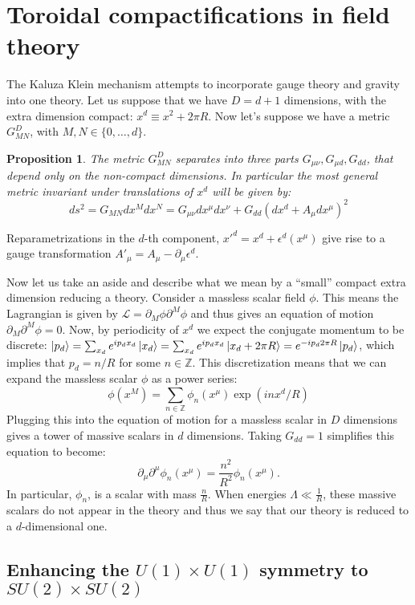 \documentclass{report}
\theoremstyle{plain}
\newtheorem{proposition}[theorem]{Proposition}
\theoremstyle{definition}
\theoremstyle{remark}
\newcommand{\FR}[2]{\frac{#1}{#2}}
\newcommand{\mc}{\mathcal}
\newcommand{\di}{\partial}
\newcommand{\bZ}{\mathbb{Z}}
\begin{document}
\section{Toroidal compactifications in field theory}
The Kaluza Klein mechanism attempts to incorporate gauge theory and gravity
into one theory. Let us suppose that we have $D=d+1$ dimensions, with
the extra dimension compact: $x^d\equiv x^2+2\pi R$. Now let's suppose we
have a metric $G^D_{MN}$, with $M,N\in \{0,\dots,d\}$. 

\begin{proposition}
    The metric $G^D_{MN}$ separates into three parts $G_{\mu\nu}, G_{\mu
    d}, G_{dd}$, that depend only on the non-compact dimensions. In
    particular the most general metric invariant under translations of
    $x^d$ will be given by:
\[ ds^2 = G_{MN}dx^M dx^N = G_{\mu\nu}dx^\mu dx^\nu+G_{dd}(dx^d+A_\mu
dx^\mu)^2\]
\end{proposition}
Reparametrizations in the $d$-th component, $x'^d=x^d+\epsilon^d(x^\mu)$
give rise to a gauge transformation $A'_\mu = A_\mu - \di_\mu\epsilon^d$.

Now let us take an aside and describe what we mean by a ``small'' compact
extra dimension reducing a theory. Consider a massless scalar field $\phi$.
This means the Lagrangian is given by $\mc L = \di_M \phi \di^M \phi$ and
thus gives an equation of motion $\di_M\di^M\phi = 0$. Now, by periodicity
of $x^d$ we expect the conjugate momentum to be discrete: $\ket{p_d} =
\sum_{x_d} e^{ip_dx_d}\ket{x_d} = \sum_{x_d} e^{ip_dx_d}\ket{x_d+2\pi R} =
e^{-ip_d2\pi R}\ket{p_d}$, which implies that $p_d = n/R$ for some $n \in
\bZ$. This discretization means that we can expand the massless scalar
$\phi$ as a power series:
\[\phi(x^M) = \sum_{n\in\bZ} \phi_n(x^\mu)\exp(inx^d/R)\]
Plugging this into the equation of motion for a massless scalar in $D$
dimensions gives a tower of massive scalars in $d$ dimensions. Taking
$G_{dd}=1$ simplifies this equation to become:
\[ \di_\mu\di^\mu \phi_n(x^\mu) = \FR{n^2}{R^2}\phi_n(x^\mu).\]
In particular, $\phi_n$, is a scalar with mass $\FR{n}{R}$. When energies
$\Lambda \ll \FR{1}{R}$, these massive scalars do not appear in the theory
and thus we say that our theory is reduced to a $d$-dimensional one.

\subsection{Enhancing the $U(1)\times U(1)$ symmetry to $SU(2)\times SU(2)$}
\end{document}
